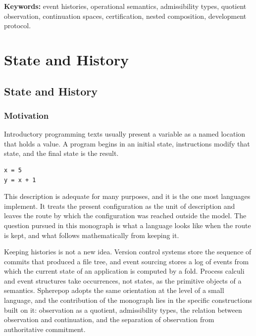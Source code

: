\documentclass[12pt,oneside,openany]{book}
\theoremstyle{spherepop}
\theoremstyle{remarkstyle}
\begin{document}
\vspace{2.2em}
\noindent\textbf{Keywords:} event histories, operational semantics, admissibility types, quotient observation, continuation spaces, certification, nested composition, development protocol.

\clearpage
\tableofcontents

\mainmatter

\part{State and History}
\label{part:pop-calc}

\chapter{State and History}
\label{ch:state}

\section{Motivation}

Introductory programming texts usually present a variable as a named location that holds a value. A program begins in an initial state, instructions modify that state, and the final state is the result.

\begin{lstlisting}
x = 5
y = x + 1
\end{lstlisting}

This description is adequate for many purposes, and it is the one most languages implement. It treats the present configuration as the unit of description and leaves the route by which the configuration was reached outside the model. The question pursued in this monograph is what a language looks like when the route is kept, and what follows mathematically from keeping it.

Keeping histories is not a new idea. Version control systems store the sequence of commits that produced a file tree, and event sourcing \cite{fowler} stores a log of events from which the current state of an application is computed by a fold. Process calculi \cite{hoare,milner} and event structures \cite{winskel} take occurrences, not states, as the primitive objects of a semantics. Spherepop adopts the same orientation at the level of a small language, and the contribution of the monograph lies in the specific constructions built on it: observation as a quotient, admissibility types, the relation between observation and continuation, and the separation of observation from authoritative commitment.
\end{document}
